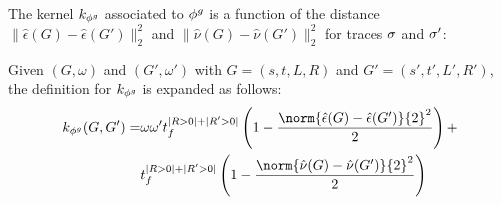 %
%
The kernel $k_{{\phi^{g}}}$ associated to ${\phi^{g}}$ is {a function of the distance  $\|\hat{\epsilon}(G)-\hat{\epsilon}(G')\|_2^2$ and $\|\hat{\nu}(G)-\hat{\nu}(G')\|_2^2$ for traces $\sigma$ and ${{\sigma'}}$:}
%
\begin{proposition}\label{lem:rewritinglemma}
Given  $(G,\omega)$ and $(G',\omega')$ with $G=(s,t,L,R)$ and $G'=(s',t',L',R')$, the definition for $k_{\phi^{g}}$ is expanded as follows:
$$\begin{aligned}
k_{\gorgembed}(G,G')=&\omega\omega't_f^{|R>0|+|R'>0|}\left(1-\frac{\norm{\hat{\epsilon}(G)-\hat{\epsilon}(G')}{2}^2}{2}\right)+\\
&t_f^{|R>0|+|R'>0|}\left(1-\frac{\norm{\hat{\nu}(G)-\hat{\nu}(G')}{2}^2}{2}\right)
\end{aligned}$$

\end{proposition}
